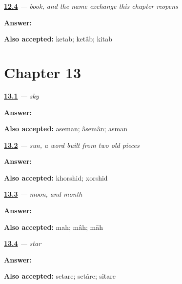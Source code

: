 \noindent\begin{minipage}[t]{\linewidth}
\raggedright
\hyperlink{review-FA-C12-ketab-request}{\textbf{12.4}} \emph{ — book, and the name exchange this chapter reopens}\par
\small \textbf{Answer:} \par
\footnotesize \textbf{Also accepted:} ketab; ketâb; kitab
\end{minipage}\par\medskip

\section*{Chapter 13}

\noindent\begin{minipage}[t]{\linewidth}
\raggedright
\hyperlink{review-FA-C13-aseman-meaning}{\textbf{13.1}} \emph{ — sky}\par
\small \textbf{Answer:} \par
\footnotesize \textbf{Also accepted:} aseman; âsemân; asman
\end{minipage}\par\medskip

\noindent\begin{minipage}[t]{\linewidth}
\raggedright
\hyperlink{review-FA-C13-khorshid-meaning}{\textbf{13.2}} \emph{ — sun, a word built from two old pieces}\par
\small \textbf{Answer:} \par
\footnotesize \textbf{Also accepted:} khorshid; xorshid
\end{minipage}\par\medskip

\noindent\begin{minipage}[t]{\linewidth}
\raggedright
\hyperlink{review-FA-C13-mah-meaning}{\textbf{13.3}} \emph{ — moon, and month}\par
\small \textbf{Answer:} \par
\footnotesize \textbf{Also accepted:} mah; mâh; māh
\end{minipage}\par\medskip

\noindent\begin{minipage}[t]{\linewidth}
\raggedright
\hyperlink{review-FA-C13-setare-meaning}{\textbf{13.4}} \emph{ — star}\par
\small \textbf{Answer:} \par
\footnotesize \textbf{Also accepted:} setare; setâre; sitare
\end{minipage}\par\medskip

